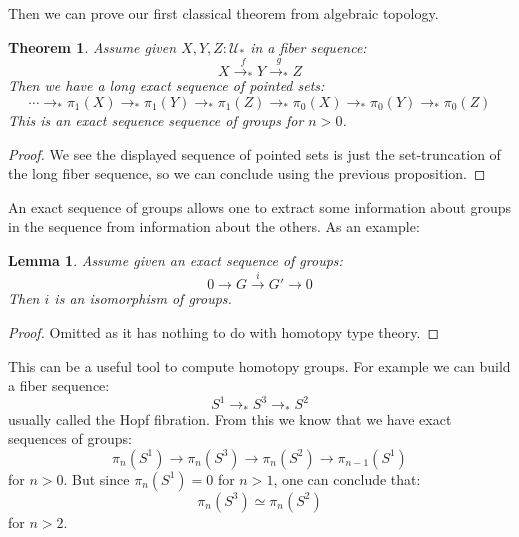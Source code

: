 \documentclass{article}
\newcommand{\U}{{\mathcal U}}
\renewcommand{\r}{\rightarrow}
\newtheorem{lemma}{Lemma}
\newtheorem{theorem}{Theorem}
\begin{document}
Then we can prove our first classical theorem from algebraic topology.

\begin{theorem}
Assume given $X,Y,Z:\U_*$ in a fiber sequence:
\[X \overset{f}{\r_*} Y\overset{g}{\r_*} Z\] 
Then we have a long exact sequence of pointed sets:
\[\cdots \r_* \pi_1(X)\r_*\pi_1(Y)\r_*\pi_1(Z) \r_* \pi_0(X)\r_*\pi_0(Y)\r_*\pi_0(Z)\]
This is an exact sequence sequence of groups for $n>0$. 
\end{theorem}
\begin{proof}
We see the displayed sequence of pointed sets is just the set-truncation of the long fiber sequence, so we can conclude using the previous proposition.%
\end{proof}

An exact sequence of groups allows one to extract some information about groups in the sequence from information about the others. As an example:

\begin{lemma}
Assume given an exact sequence of groups:
\[0 \r G \overset{i}{\r} G' \r 0\]
Then $i$ is an isomorphism of groups.
\end{lemma}
\begin{proof}
Omitted as it has nothing to do with homotopy type theory.
\end{proof}

This can be a useful tool to compute homotopy groups. For example we can build a fiber sequence: 
\[S^1\r_* S^3\r_*S^2\]
usually called the Hopf fibration. From this we know that we have exact sequences of groups:
\[\pi_n(S^1)\r \pi_n(S^3)\r \pi_n(S^2)\r \pi_{n-1}(S^1) \]
for $n> 0$. But since $\pi_n(S^1) = 0$ for $n>1$, one can conclude that:
\[\pi_n(S^3)\simeq \pi_n(S^2)\]
for $n>2$.
\end{document}

